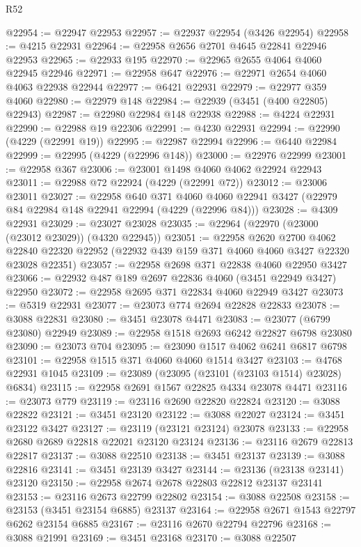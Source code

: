 \begin{lexlean}{R52}
\begin{coremodule}
@22954 := @22947 @22953
@22957 := @22937 @22954 (@3426 @22954)
@22958 := @4215 @22931
@22964 := @22958 @2656 @2701 @4645 @22841 @22946 @22953
@22965 := @22933 @195
@22970 := @22965 @2655 @4064 @4060 @22945 @22946
@22971 := @22958 @647
@22976 := @22971 @2654 @4060 @4063 @22938 @22944
@22977 := @6421 @22931
@22979 := @22977 @359 @4060
@22980 := @22979 @148
@22984 := @22939 (@3451 (@400 @22805) @22943)
@22987 := @22980 @22984 @148 @22938
@22988 := @4224 @22931
@22990 := @22988 @19 @22306
@22991 := @4230 @22931
@22994 := @22990 (@4229 (@22991 @19))
@22995 := @22987 @22994
@22996 := @6440 @22984
@22999 := @22995 (@4229 (@22996 @148))
@23000 := @22976 @22999
@23001 := @22958 @367
@23006 := @23001 @1498 @4060 @4062 @22924 @22943
@23011 := @22988 @72 @22924 (@4229 (@22991 @72))
@23012 := @23006 @23011
@23027 := @22958
    @640
    @371
    @4060
    @4060
    @22941
    @3427
    (@22979 @84 @22984 @148 @22941 @22994 (@4229 (@22996 @84)))
@23028 := @4309 @22931
@23029 := @23027 @23028
@23035 := @22964 (@22970 (@23000 (@23012 @23029)) (@4320 @22945))
@23051 := @22958
    @2620
    @2700
    @4062
    @22840
    @22320
    @22952
    (@22932 @439 @159 @371 @4060 @4060 @3427 @22320 @23028 @22351)
@23057 := @22958 @2698 @371 @22838 @4060 @22950 @3427
@23066 := @22932 @487 @189 @2697 @22836 @4060 (@3451 @22949 @3427) @22950
@23072 := @22958 @2695 @371 @22834 @4060 @22949 @3427
@23073 := @5319 @22931
@23077 := @23073 @774 @2694 @22828 @22833
@23078 := @3088 @22831
@23080 := @3451 @23078 @4471
@23083 := @23077 (@6799 @23080) @22949
@23089 := @22958 @1518 @2693 @6242 @22827 @6798 @23080
@23090 := @23073 @704
@23095 := @23090 @1517 @4062 @6241 @6817 @6798
@23101 := @22958 @1515 @371 @4060 @4060 @1514 @3427
@23103 := @4768 @22931 @1045
@23109 := @23089 (@23095 (@23101 (@23103 @1514) @23028) @6834)
@23115 := @22958 @2691 @1567 @22825 @4334 @23078 @4471
@23116 := @23073 @779
@23119 := @23116 @2690 @22820 @22824
@23120 := @3088 @22822
@23121 := @3451 @23120
@23122 := @3088 @22027
@23124 := @3451 @23122 @3427
@23127 := @23119 (@23121 @23124) @23078
@23133 := @22958 @2680 @2689 @22818 @22021 @23120 @23124
@23136 := @23116 @2679 @22813 @22817
@23137 := @3088 @22510
@23138 := @3451 @23137
@23139 := @3088 @22816
@23141 := @3451 @23139 @3427
@23144 := @23136 (@23138 @23141) @23120
@23150 := @22958 @2674 @2678 @22803 @22812 @23137 @23141
@23153 := @23116 @2673 @22799 @22802
@23154 := @3088 @22508
@23158 := @23153 (@3451 @23154 @6885) @23137
@23164 := @22958 @2671 @1543 @22797 @6262 @23154 @6885
@23167 := @23116 @2670 @22794 @22796
@23168 := @3088 @21991
@23169 := @3451 @23168
@23170 := @3088 @22507

\end{coremodule}
\end{lexlean}
